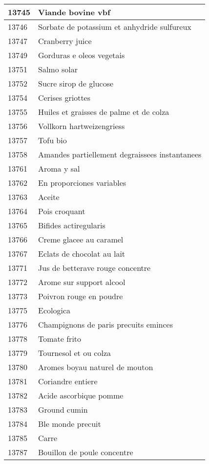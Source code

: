 \begin{longtable}{|l|l|}
13745 & Viande bovine vbf \\ \hline 
13746 & Sorbate de potassium et anhydride sulfureux \\ \hline 
13747 & Cranberry juice \\ \hline 
13749 & Gorduras e oleos vegetais \\ \hline 
13751 & Salmo solar \\ \hline 
13752 & Sucre sirop de glucose \\ \hline 
13754 & Cerises griottes \\ \hline 
13755 & Huiles et graisses de palme et de colza \\ \hline 
13756 & Vollkorn hartweizengriess \\ \hline 
13757 & Tofu bio \\ \hline 
13758 & Amandes partiellement degraissees instantanees \\ \hline 
13761 & Aroma y sal \\ \hline 
13762 & En proporciones variables \\ \hline 
13763 & Aceite \\ \hline 
13764 & Pois croquant \\ \hline 
13765 & Bifides actiregularis \\ \hline 
13766 & Creme glacee au caramel \\ \hline 
13767 & Eclats de chocolat au lait \\ \hline 
13771 & Jus de betterave rouge concentre \\ \hline 
13772 & Arome sur support alcool \\ \hline 
13773 & Poivron rouge en poudre \\ \hline 
13775 & Ecologica \\ \hline 
13776 & Champignons de paris precuits eminces \\ \hline 
13778 & Tomate frito \\ \hline 
13779 & Tournesol et ou colza \\ \hline 
13780 & Aromes boyau naturel de mouton \\ \hline 
13781 & Coriandre entiere \\ \hline 
13782 & Acide ascorbique pomme \\ \hline 
13783 & Ground cumin \\ \hline 
13784 & Ble monde precuit \\ \hline 
13785 & Carre \\ \hline 
13787 & Bouillon de poule concentre \\ \hline 

\end{longtable}
